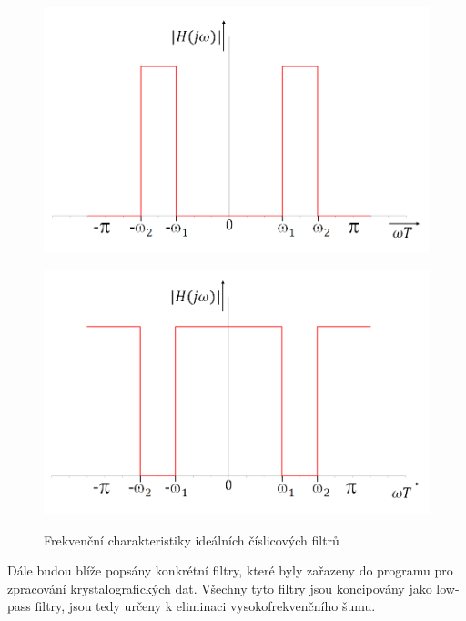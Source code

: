 \documentclass[a4paper, 12pt]{article}
\begin{document}
\begin{figure}[hbt!]
\begin{minipage}[b]{6.5cm}
\end{minipage}\vspace{0.8cm}
\begin{minipage}[b]{6.5cm}
  \centering
  \includegraphics[width=\linewidth]{passband.png}\\
\end{minipage}\hspace{0.5cm}
\begin{minipage}[b]{6.5cm}
  \centering
  \includegraphics[width=\linewidth]{bandstop.png}\\
\end{minipage}\vspace{0.4cm}
\caption{Frekvenční charakteristiky ideálních číslicových filtrů}
\label{fig:filtryfrekvs}
\end{figure}


Dále budou blíže popsány konkrétní filtry, které byly zařazeny do programu pro zpracování krystalografických dat. Všechny tyto filtry jsou koncipovány jako low-pass filtry, jsou tedy určeny k eliminaci vysokofrekvenčního šumu.
\end{document}
